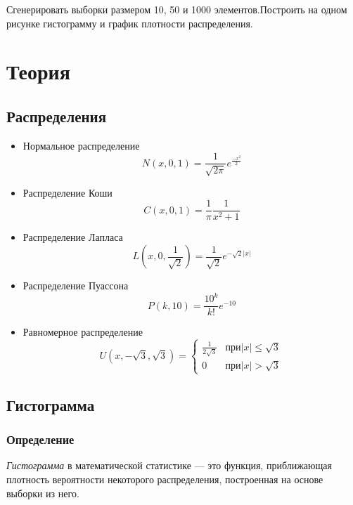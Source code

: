 \documentclass[a4paper]{article}
\begin{document}
\noindent Сгенерировать выборки размером 10, 50 и 1000 элементов.\newline Построить на одном рисунке гистограмму и график плотности распределения.

\section {Теория}

\subsection{Распределения}
	\begin{itemize}
		\item Нормальное распределение \begin{equation}
										  N(x, 0, 1) = \frac{1}{\sqrt{2\pi}}e^{\frac{-x^2}{2}} \label{norm} 
									   \end{equation}
		\item Распределение Коши \begin{equation}
									C(x, 0, 1) = \frac{1}{\pi}\frac{1}{x^2+1} \label{koshi}
								 \end{equation} 
		\item Распределение Лапласа \begin{equation}
									   L(x, 0, \frac{1}{\sqrt{2}}) = \frac{1}{\sqrt{2}}e^{-\sqrt{2}|x|} \label{laplace} 
									\end{equation}
		\item Распределение Пуассона \begin{equation}
										P(k, 10) = \frac{10^k}{k!}e^{-10}\label{puasson}
									 \end{equation}
		\item Равномерное распределение \begin{equation}
				U(x, -\sqrt{3}, \sqrt{3}) =
				\begin{cases}
					\frac{1}{2\sqrt{3}} &\text{$при |x|\leq \sqrt{3}$}\\
					0 &\text{$при |x|>\sqrt{3}$}
				\end{cases}
				\label{uni} 
			\end{equation}
	\end{itemize}

	\subsection{Гистограмма}
	\subsubsection{Определение}
	\noindent \textit{Гистограмма} в математической статистике — это функция, приближающая плотность вероятности некоторого распределения, построенная на основе выборки из него.
	
\end{document}
